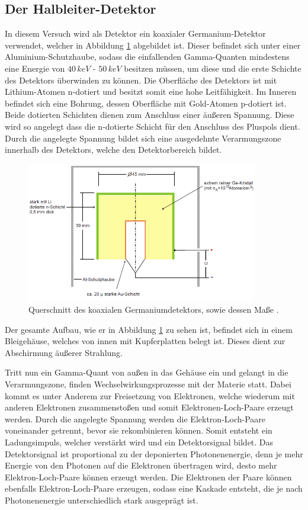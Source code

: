 \subsection{Der Halbleiter-Detektor}
In diesem Versuch wird als Detektor ein koaxialer Germanium-Detektor verwendet, welcher in Abbildung \ref{fig:tfig7} abgebildet ist.
Dieser befindet sich unter einer Aluminium-Schutzhaube, sodass die einfallenden Gamma-Quanten mindestens eine Energie von $40 \,\si{keV}$ - $50\,\si{keV}$ besitzen müssen, um diese und die erste Schichte des Detektors überwinden zu können.
Die Oberfläche des Detektors ist mit Lithium-Atomen n-dotiert und besitzt somit eine hohe Leitfähigkeit.
Im Inneren befindet sich eine Bohrung, dessen Oberfläche mit Gold-Atomen p-dotiert ist.
Beide dotierten Schichten dienen zum Anschluss einer äußeren Spannung.
Diese wird so angelegt dass die n-dotierte Schicht für den Anschluss des Pluspols dient.
Durch die angelegte Spannung bildet sich eine ausgedehnte Verarmungszone innerhalb des Detektors, welche den Detektorbereich bildet.

\FloatBarrier
\begin{figure}
\centering
\includegraphics[width = 0.9\textwidth]{Detektor.png}
\caption{Querschnitt des koaxialen Germaniumdetektors, sowie dessen Maße \cite{quelle01}.}
\label{fig:tfig7}
\end{figure}
\FloatBarrier

Der gesamte Aufbau, wie er in Abbildung \ref{fig:tfig7} zu sehen ist, befindet sich in einem Bleigehäuse, welches von innen mit Kupferplatten belegt ist.
Dieses dient zur Abschirmung äußerer Strahlung.

Tritt nun ein Gamma-Quant von außen in das Gehäuse ein und gelangt in die Verarmungszone, finden Wechselwirkungsprozesse mit der Materie statt.
Dabei kommt es unter Anderem zur Freisetzung von Elektronen, welche wiederum mit anderen Elektronen zusammenstoßen und somit Elektronen-Loch-Paare erzeugt werden.
Durch die angelegte Spannung werden die Elektron-Loch-Paare voneinander getrennt, bevor sie rekombinieren können.
Somit entsteht ein Ladungsimpuls, welcher verstärkt wird und ein Detektorsignal bildet.
Das Detektorsignal ist proportional zu der deponierten Photonenenergie, denn je mehr Energie von den Photonen auf die Elektronen übertragen wird, desto mehr Elektron-Loch-Paare können erzeugt werden.
Die Elektronen der Paare können ebenfalls Elektron-Loch-Paare erzeugen, sodass eine Kaskade entsteht, die je nach Photonenenergie unterschiedlich stark ausgeprägt ist.

